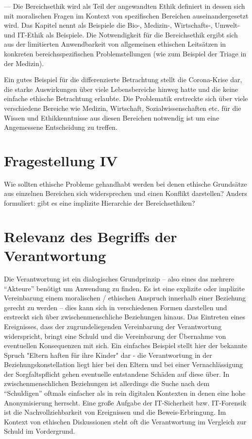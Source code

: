 \documentclass[journal]{IEEEtran}
\begin{document}
\begin{onecolumn}
--- Die Bereichsethik wird als Teil der angewandten Ethik definiert in dessen sich mit moralischen Fragen
im Kontext von spezifischen Bereichen auseinandergesetzt wird. Das Kapitel nennt als Beispiele die Bio-,
Medizin-, Wirtschafts-, Umwelt- und IT-Ethik als Beispiele. Die Notwendigkeit für die Bereichsethik ergibt
sich aus der limitierten Anwendbarkeit von allgemeinen ethischen Leitsätzen in konkreten bereichsspezifischen 
Problemstellungen (wie zum Beispiel der Triage in der Medizin). 

Ein gutes Beispiel für die differenzierte Betrachtung stellt die Corona-Krise dar, die starke Auswirkungen über
viele Lebensbereiche hinweg hatte und die keine einfache ethische Betrachtung erlaubte. Die Problematik erstreckte
sich über viele verschiedene Bereiche wie Medizin, Wirtschaft, Sozialwissenschaften etc. für die Wissen und
Ethikkenntnisse aus diesen Bereichen notwendig ist um eine Angemessene Entscheidung zu treffen.

\section*{Fragestellung IV}

Wie sollten ethische Probleme gehandhabt werden bei denen ethische Grundsätze aus einzelnen Bereichen sich
widersprechen und einen Konflikt darstellen? Anders formuliert: gibt es eine implizite Hierarchie der
Bereichsethiken?

\newpage

\section{Relevanz des Begriffs der Verantwortung}

Die Verantwortung ist ein dialogisches Grundprinzip – also eines das mehrere ``Akteure'' benötigt um
Anwendung zu finden. Es ist eine explizite oder implizite Vereinbarung einem moralischen / ethischen 
Anspruch innerhalb einer Beziehung gerecht zu werden – dies kann sich in verschiedenen Formen darstellen
und erstreckt sich über zwischenmenschliche Beziehungen hinaus. Das Eintreten eines Ereignisses, dass der
zugrundeliegenden Vereinbarung der Verantwortung widerspricht, bringt eine Schuld und die Vereinbarung der
Übernahme von eventuellen Konsequenzen mit sich. Ein einfaches Beispiel stellt hier der bekannte Spruch
"Eltern haften für ihre Kinder" dar - die Verantwortung in der Beziehungskonstellation liegt hier bei den
Eltern und bei einer Vernachlässigung der Sorgfaltspflicht gehen eventuelle entstandene Schäden auf diese
über. In zwischenmenschlichen Beziehungen ist allerdings die Suche nach dem ``Schuldigen'' oftmals einfacher
als in rein digitalen Kontexten in denen eine hohe Anonymisierung herrscht. Eine große Aufgabe der IT-Sicherheit
bzw. IT-Forensik ist die Nachvollziehbarkeit von Ereignissen und die Beweis-Erbringung. Im Kontext von
ethischen Diskussionen steht oft die Verantwortung im Vergleich zur Schuld im Vordergrund.


\end{onecolumn}
\end{document}
